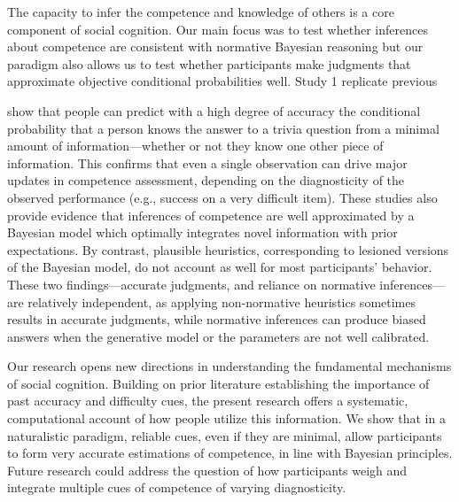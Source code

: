 \documentclass[10pt,letterpaper]{article}
\begin{document}
The capacity to infer the competence and knowledge of others is a core component of social cognition. Our main focus was to test whether inferences about competence are consistent with normative Bayesian reasoning but our paradigm also allows us to test whether participants make judgments that approximate objective conditional probabilities well. Study 1 replicate previous 

show that people can predict with a high degree of accuracy the conditional probability that a person knows the answer to a trivia question from a minimal amount of information---whether or not they know one other piece of information. This confirms that even a single observation can drive major updates in competence assessment, depending on the diagnosticity of the observed performance (e.g., success on a very difficult item). These studies also provide evidence that inferences of competence are well approximated by a Bayesian model which optimally integrates novel information with prior expectations. By contrast, plausible heuristics, corresponding to lesioned versions of the Bayesian model, do not account as well for most participants' behavior. These two findings---accurate judgments, and reliance on normative inferences---are relatively independent, as applying non-normative heuristics sometimes results in accurate judgments, while normative inferences can produce biased answers when the generative model or the parameters are not well calibrated.

Our research opens new directions in understanding the fundamental mechanisms of social cognition. Building on prior literature establishing the importance of past accuracy and difficulty cues, the present research offers a systematic, computational account of how people utilize this information. We show that in a naturalistic paradigm, reliable cues, even if they are minimal, allow participants to form very accurate estimations of competence, in line with Bayesian principles. Future research could address the question of how participants weigh and integrate multiple cues of competence of varying diagnosticity.

\printbibliography
\end{document}
